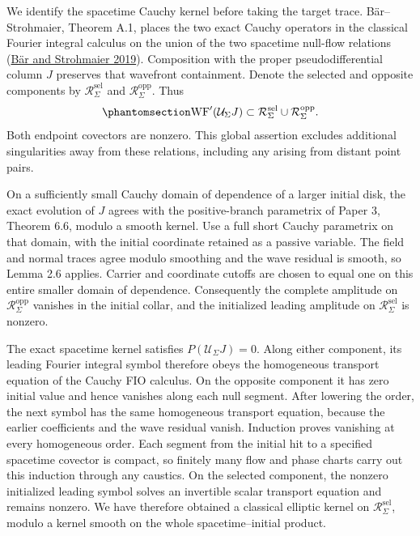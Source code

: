 \documentclass[
  english,
  11pt,
  reqno]{amsart}
\begin{document}
We identify the spacetime Cauchy kernel before taking the target trace.
Bär--Strohmaier, Theorem A.1, places the two exact Cauchy operators in
the classical Fourier integral calculus on the union of the two
spacetime null-flow relations (\hyperref[ref-BarStrohmaier2019]{Bär and
Strohmaier 2019}). Composition with the proper pseudodifferential column
\(J\) preserves that wavefront containment. Denote the selected and
opposite components by \(\mathcal R_\Sigma^{\mathrm{sel}}\) and
\(\mathcal R_\Sigma^{\mathrm{opp}}\). Thus
\begin{equation}\protect\phantomsection\label{eq:global-cauchy-two-branch-relation}{
\operatorname{WF}'(\mathcal U_\Sigma J)
\subset \mathcal R_\Sigma^{\mathrm{sel}}
\cup\mathcal R_\Sigma^{\mathrm{opp}}.
}\end{equation} Both endpoint covectors are nonzero. This global
assertion excludes additional singularities away from these relations,
including any arising from distant point pairs.

On a sufficiently small Cauchy domain of dependence of a larger initial
disk, the exact evolution of \(J\) agrees with the positive-branch
parametrix of Paper 3, Theorem 6.6, modulo a smooth kernel. Use a full
short Cauchy parametrix on that domain, with the initial coordinate
retained as a passive variable. The field and normal traces agree modulo
smoothing and the wave residual is smooth, so Lemma 2.6 applies. Carrier
and coordinate cutoffs are chosen to equal one on this entire smaller
domain of dependence. Consequently the complete amplitude on
\(\mathcal R_\Sigma^{\mathrm{opp}}\) vanishes in the initial collar, and
the initialized leading amplitude on
\(\mathcal R_\Sigma^{\mathrm{sel}}\) is nonzero.

The exact spacetime kernel satisfies \(P(\mathcal U_\Sigma J)=0\). Along
either component, its leading Fourier integral symbol therefore obeys
the homogeneous transport equation of the Cauchy FIO calculus. On the
opposite component it has zero initial value and hence vanishes along
each null segment. After lowering the order, the next symbol has the
same homogeneous transport equation, because the earlier coefficients
and the wave residual vanish. Induction proves vanishing at every
homogeneous order. Each segment from the initial hit to a specified
spacetime covector is compact, so finitely many flow and phase charts
carry out this induction through any caustics. On the selected
component, the nonzero initialized leading symbol solves an invertible
scalar transport equation and remains nonzero. We have therefore
obtained a classical elliptic kernel on
\(\mathcal R_\Sigma^{\mathrm{sel}}\), modulo a kernel smooth on the
whole spacetime--initial product.
\end{document}
